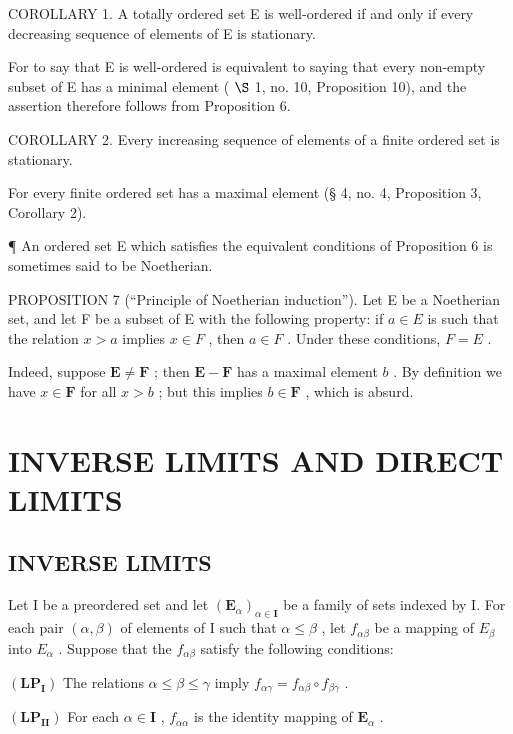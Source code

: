 COROLLARY 1. A totally ordered set E is well-ordered if and only if every decreasing sequence of elements of E is stationary.

For to say that E is well-ordered is equivalent to saying that every non-empty subset of E has a minimal element ( \(\S\) 1, no. 10, Proposition 10), and the assertion therefore follows from Proposition 6.

COROLLARY 2. Every increasing sequence of elements of a finite ordered set is stationary.

For every finite ordered set has a maximal element (§ 4, no. 4, Proposition 3, Corollary 2).

¶ An ordered set E which satisfies the equivalent conditions of Proposition 6 is sometimes said to be Noetherian.

PROPOSITION 7 (``Principle of Noetherian induction''). Let E be a Noetherian set, and let F be a subset of E with the following property: if \(a \in E\) is such that the relation \(x > a\) implies \(x \in F\) , then \(a \in F\) . Under these conditions, \(F = E\) .

Indeed, suppose \(\mathbf{E} \neq \mathbf{F}\) ; then \(\mathbf{E} - \mathbf{F}\) has a maximal element \(b\) . By definition we have \(x \in \mathbf{F}\) for all \(x > b\) ; but this implies \(b \in \mathbf{F}\) , which is absurd.

\section{INVERSE LIMITS AND DIRECT LIMITS}

\subsection{INVERSE LIMITS}

Let I be a preordered set and let \((\mathbf{E}_{\alpha})_{\alpha\in\mathbf{I}}\) be a family of sets indexed by I. For each pair \((\alpha,\beta)\) of elements of I such that \(\alpha\leqslant\beta\) , let \(f_{\alpha\beta}\) be a mapping of \(E_{\beta}\) into \(E_{\alpha}\) . Suppose that the \(f_{\alpha\beta}\) satisfy the following conditions:

\((\mathbf{LP}_{\mathbf{I}})\) The relations \(\alpha \leqslant \beta \leqslant \gamma\) imply \(f_{\alpha \gamma} = f_{\alpha \beta} \circ f_{\beta \gamma}\) .

\((\mathbf{LP}_{\mathbf{II}})\) For each \(\alpha \in \mathbf{I}\) , \(f_{\alpha \alpha}\) is the identity mapping of \(\mathbf{E}_{\alpha}\) .

